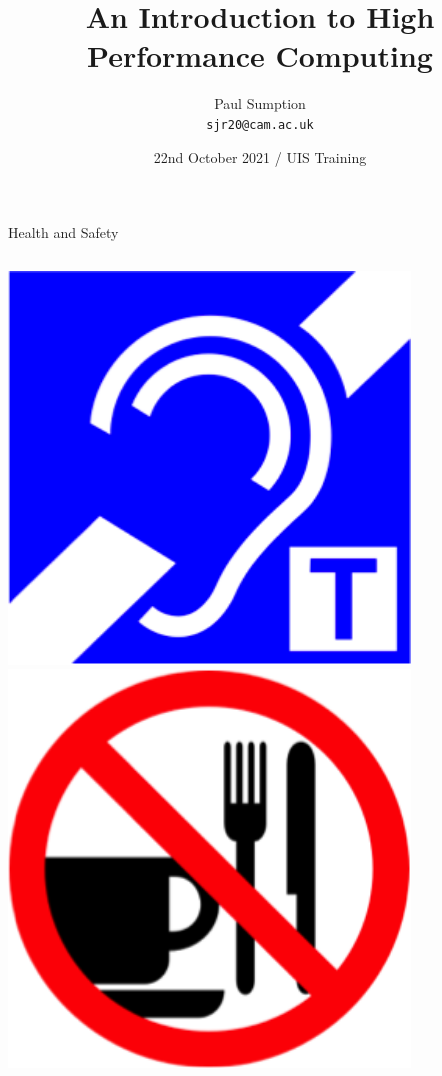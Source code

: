 \documentclass{beamer}
\title[HPC: An introduction] %
{An Introduction to High Performance Computing}
\author[P Sumption] %
{Paul Sumption\\ \texttt{sjr20@cam.ac.uk}}
\institute[Research Computing Services, University of Cambridge] %
{Research Computing Services (http://www.hpc.cam.ac.uk/)\\
University Information Services (http://www.uis.cam.ac.uk/)}
\date[22/10/2021] %
{22nd October 2021 / UIS Training}
\begin{document}
\begin{frame}
  \titlepage
\end{frame}

\begin{frame}{Health and Safety}
\begin{columns}[c]
\begin{column}{0.33\textwidth}
\begin{center}
\includegraphics[width=0.8\textwidth,height=0.5\textheight,keepaspectratio]{imgs/health-safety-1.png}\\
\includegraphics[width=0.8\textwidth,height=0.5\textheight,keepaspectratio]{imgs/health-safety-4.png}

\end{center}
\end{column}
\end{columns}
\end{frame}
\end{document}
